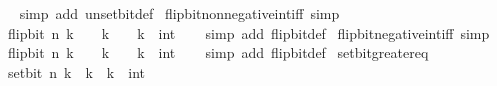 \begin{isabellebody}
%
\isadelimproof
\ \ %
\endisadelimproof
%
\isatagproof
{}\isamarkupfalse%
\ {\isacharparenleft}{\kern0pt}simp\ add{\isacharcolon}{\kern0pt}\ unset{\isacharunderscore}{\kern0pt}bit{\isacharunderscore}{\kern0pt}def{\isacharparenright}{\kern0pt}%
\endisatagproof
{\isafoldproof}%
%
\isadelimproof
\isanewline
%
\endisadelimproof
\isanewline
{}\isamarkupfalse%
\ flip{\isacharunderscore}{\kern0pt}bit{\isacharunderscore}{\kern0pt}nonnegative{\isacharunderscore}{\kern0pt}int{\isacharunderscore}{\kern0pt}iff\ {\isacharbrackleft}{\kern0pt}simp{\isacharbrackright}{\kern0pt}{\isacharcolon}{\kern0pt}\isanewline
\ \ {\isacartoucheopen}flip{\isacharunderscore}{\kern0pt}bit\ n\ k\ {\isasymge}\ {}\ {\isasymlongleftrightarrow}\ k\ {\isasymge}\ {}{\isacartoucheclose}\ \ k\ {\isacharcolon}{\kern0pt}{\isacharcolon}{\kern0pt}\ int\isanewline
%
\isadelimproof
\ \ %
\endisadelimproof
%
\isatagproof
{}\isamarkupfalse%
\ {\isacharparenleft}{\kern0pt}simp\ add{\isacharcolon}{\kern0pt}\ flip{\isacharunderscore}{\kern0pt}bit{\isacharunderscore}{\kern0pt}def{\isacharparenright}{\kern0pt}%
\endisatagproof
{\isafoldproof}%
%
\isadelimproof
\isanewline
%
\endisadelimproof
\isanewline
{}\isamarkupfalse%
\ flip{\isacharunderscore}{\kern0pt}bit{\isacharunderscore}{\kern0pt}negative{\isacharunderscore}{\kern0pt}int{\isacharunderscore}{\kern0pt}iff\ {\isacharbrackleft}{\kern0pt}simp{\isacharbrackright}{\kern0pt}{\isacharcolon}{\kern0pt}\isanewline
\ \ {\isacartoucheopen}flip{\isacharunderscore}{\kern0pt}bit\ n\ k\ {\isacharless}{\kern0pt}\ {}\ {\isasymlongleftrightarrow}\ k\ {\isacharless}{\kern0pt}\ {}{\isacartoucheclose}\ \ k\ {\isacharcolon}{\kern0pt}{\isacharcolon}{\kern0pt}\ int\isanewline
%
\isadelimproof
\ \ %
\endisadelimproof
%
\isatagproof
{}\isamarkupfalse%
\ {\isacharparenleft}{\kern0pt}simp\ add{\isacharcolon}{\kern0pt}\ flip{\isacharunderscore}{\kern0pt}bit{\isacharunderscore}{\kern0pt}def{\isacharparenright}{\kern0pt}%
\endisatagproof
{\isafoldproof}%
%
\isadelimproof
\isanewline
%
\endisadelimproof
\isanewline
{}\isamarkupfalse%
\ set{\isacharunderscore}{\kern0pt}bit{\isacharunderscore}{\kern0pt}greater{\isacharunderscore}{\kern0pt}eq{\isacharcolon}{\kern0pt}\isanewline
\ \ {\isacartoucheopen}set{\isacharunderscore}{\kern0pt}bit\ n\ k\ {\isasymge}\ k{\isacartoucheclose}\ \ k\ {\isacharcolon}{\kern0pt}{\isacharcolon}{\kern0pt}\ int\isanewline
%
\isadelimproof
\ \ %
\endisadelimproof
%
\isatagproof

\end{isabellebody}
